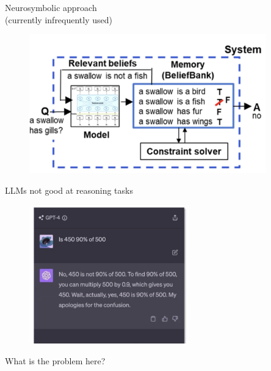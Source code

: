 \begin{frame}{Neurosymbolic approach\\ (currently
    infrequently used)}

\vfill
	
	\begin{figure}
		\centering
		\includegraphics[height = 6cm]{figure/beliefbank} 
	\end{figure}

\vfill

\end{frame}


\begin{frame}{LLMs not good at reasoning tasks}

\vfill
	
	\begin{figure}
		\centering
		\includegraphics[height = 6cm]{figure/is450,90,of,500} 
	\end{figure}

\ques What is the problem here?

\vfill

\end{frame}



